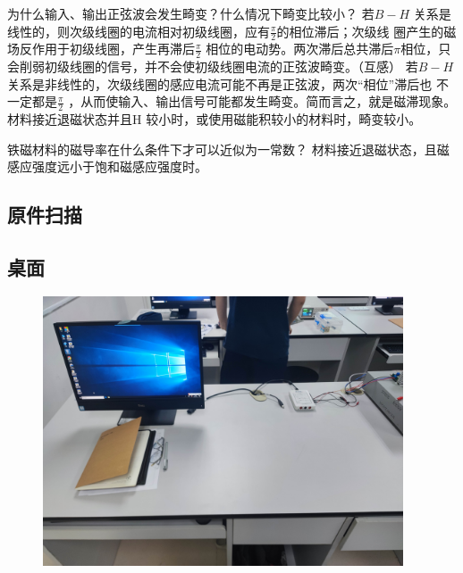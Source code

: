 \documentclass[dvipsnames, svgnames,a4paper,11pt]{article}
\begin{document}
\begin{question}
	为什么输入、输出正弦波会发生畸变？什么情况下畸变比较小？
	\tcblower
	若$B-H$ 关系是线性的，则次级线圈的电流相对初级线圈，应有$\frac{\pi}{2}$的相位滞后；次级线
圈产生的磁场反作用于初级线圈，产生再滞后$\frac{\pi}{2}$
相位的电动势。两次滞后总共滞后$\pi$相位，只
会削弱初级线圈的信号，并不会使初级线圈电流的正弦波畸变。（互感）
若$B-H$ 关系是非线性的，次级线圈的感应电流可能不再是正弦波，两次“相位”滞后也
不一定都是$\frac{\pi}{2}$
，从而使输入、输出信号可能都发生畸变。简而言之，就是磁滞现象。
材料接近退磁状态并且H 较小时，或使用磁能积较小的材料时，畸变较小。
\end{question}

\begin{question}
	铁磁材料的磁导率在什么条件下才可以近似为一常数？
	\tcblower
	材料接近退磁状态，且磁感应强度远小于饱和磁感应强度时。
\end{question}
\clearpage




\clearpage
\appendix
\appendixpage
\addappheadtotoc
%
\subsection*{原件扫描}


\subsection*{桌面}
\begin{figure}[!h]
	\includegraphics[width=0.95\textwidth]{实验4桌面.jpg}
\end{figure}
\end{document}
